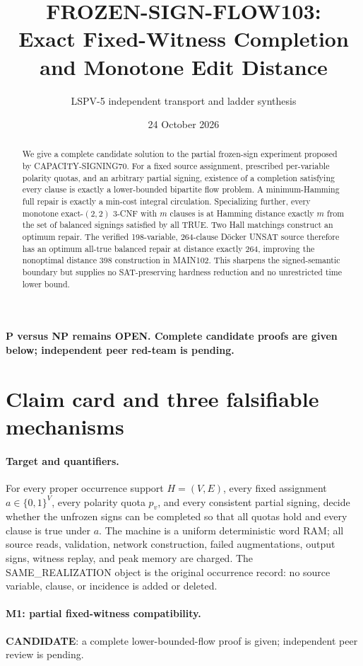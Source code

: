 \documentclass[11pt]{article}
\title{FROZEN-SIGN-FLOW103:\\Exact Fixed-Witness Completion and Monotone Edit Distance}
\author{LSPV-5 independent transport and ladder synthesis}
\date{24 October 2026}
\begin{document}
\maketitle
\begin{center}
\textbf{P versus NP remains OPEN.  Complete candidate proofs are given below; independent peer red-team is pending.}
\end{center}

\begin{abstract}
We give a complete candidate solution to the partial frozen-sign experiment proposed by CAPACITY-SIGNING70.
For a fixed source assignment, prescribed per-variable polarity quotas, and an arbitrary
partial signing, existence of a completion satisfying every clause is exactly a
lower-bounded bipartite flow problem.  A minimum-Hamming full repair is exactly a
min-cost integral circulation.  Specializing further, every monotone exact-$(2,2)$
3-CNF with $m$ clauses is at Hamming distance exactly $m$ from the set of balanced
signings satisfied by all TRUE.  Two Hall matchings construct an optimum repair.
The verified 198-variable, 264-clause D\"ocker UNSAT source therefore has an optimum
all-true balanced repair at distance exactly 264, improving the nonoptimal distance 398
construction in MAIN102.  This sharpens the signed-semantic boundary but supplies no
SAT-preserving hardness reduction and no unrestricted time lower bound.
\end{abstract}

\section{Claim card and three falsifiable mechanisms}

\paragraph{Target and quantifiers.}
For every proper occurrence support $H=(V,E)$, every fixed assignment
$a\in\{0,1\}^V$, every polarity quota $p_v$, and every consistent partial signing,
decide whether the unfrozen signs can be completed so that all quotas hold and every
clause is true under $a$.  The machine is a uniform deterministic word RAM; all source
reads, validation, network construction, failed augmentations, output signs, witness replay,
and peak memory are charged.  The SAME\_REALIZATION object is the original occurrence
record: no source variable, clause, or incidence is added or deleted.

\paragraph{M1: partial fixed-witness compatibility.}
\textbf{CANDIDATE}: a complete lower-bounded-flow proof is given; independent peer review is pending.
\end{document}
